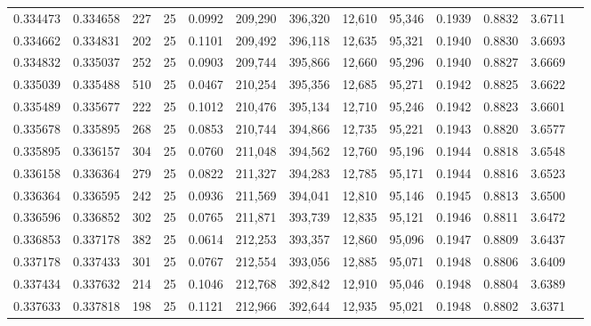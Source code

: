 \begin{tabular}{rrrrrrrrrrrrr}
0.334473 & 0.334658 &   227 &  25 &                                     0.0992 & 209,290 & 396,320 &  12,610 &  95,346 & 0.1939 & 0.8832 & 3.6711 \\
0.334662 & 0.334831 &   202 &  25 &                                     0.1101 & 209,492 & 396,118 &  12,635 &  95,321 & 0.1940 & 0.8830 & 3.6693 \\
0.334832 & 0.335037 &   252 &  25 &                                     0.0903 & 209,744 & 395,866 &  12,660 &  95,296 & 0.1940 & 0.8827 & 3.6669 \\
0.335039 & 0.335488 &   510 &  25 &                                     0.0467 & 210,254 & 395,356 &  12,685 &  95,271 & 0.1942 & 0.8825 & 3.6622 \\
0.335489 & 0.335677 &   222 &  25 &                                     0.1012 & 210,476 & 395,134 &  12,710 &  95,246 & 0.1942 & 0.8823 & 3.6601 \\
0.335678 & 0.335895 &   268 &  25 &                                     0.0853 & 210,744 & 394,866 &  12,735 &  95,221 & 0.1943 & 0.8820 & 3.6577 \\
0.335895 & 0.336157 &   304 &  25 &                                     0.0760 & 211,048 & 394,562 &  12,760 &  95,196 & 0.1944 & 0.8818 & 3.6548 \\
0.336158 & 0.336364 &   279 &  25 &                                     0.0822 & 211,327 & 394,283 &  12,785 &  95,171 & 0.1944 & 0.8816 & 3.6523 \\
0.336364 & 0.336595 &   242 &  25 &                                     0.0936 & 211,569 & 394,041 &  12,810 &  95,146 & 0.1945 & 0.8813 & 3.6500 \\
0.336596 & 0.336852 &   302 &  25 &                                     0.0765 & 211,871 & 393,739 &  12,835 &  95,121 & 0.1946 & 0.8811 & 3.6472 \\
0.336853 & 0.337178 &   382 &  25 &                                     0.0614 & 212,253 & 393,357 &  12,860 &  95,096 & 0.1947 & 0.8809 & 3.6437 \\
0.337178 & 0.337433 &   301 &  25 &                                     0.0767 & 212,554 & 393,056 &  12,885 &  95,071 & 0.1948 & 0.8806 & 3.6409 \\
0.337434 & 0.337632 &   214 &  25 &                                     0.1046 & 212,768 & 392,842 &  12,910 &  95,046 & 0.1948 & 0.8804 & 3.6389 \\
0.337633 & 0.337818 &   198 &  25 &                                     0.1121 & 212,966 & 392,644 &  12,935 &  95,021 & 0.1948 & 0.8802 & 3.6371 \\

\end{tabular}
